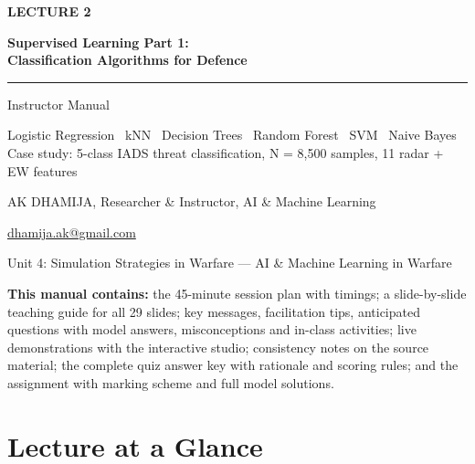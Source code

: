 \documentclass[11pt]{article}
\begin{document}
\begin{titlepage}\centering\vspace*{2.2cm}
{\color{AccN}\large\bfseries LECTURE 2\par}\vspace{0.6cm}
{\color{NavyN}\Huge\bfseries Supervised Learning Part 1:\\Classification Algorithms for Defence\par}\vspace{0.6cm}
{\color{AccN}\rule{0.7\textwidth}{1.5pt}}\par\vspace{0.6cm}
{\LARGE Instructor Manual\par}\vspace{0.4cm}
{\large\begin{minipage}{0.85\textwidth}\centering Logistic Regression \textbullet\ kNN \textbullet\ Decision Trees \textbullet\ Random Forest \textbullet\ SVM \textbullet\ Naive Bayes\\Case study: 5-class IADS threat classification, N = 8,500 samples, 11 radar + EW features\end{minipage}\par}\vspace{2cm}
{\large AK DHAMIJA, Researcher \& Instructor, AI \& Machine Learning\par}\vspace{0.2cm}
{\normalsize \href{mailto:dhamija.ak@gmail.com}{dhamija.ak@gmail.com} \quad\textbullet{}\par}\vspace{0.3cm}
{Unit 4: Simulation Strategies in Warfare --- AI \& Machine Learning in Warfare\par}\vfill
\begin{tcolorbox}[colback=NavyN!4,colframe=NavyN,boxrule=0.6pt,arc=2pt,width=0.9\textwidth]\small
\textbf{This manual contains:} the 45-minute session plan with timings; a slide-by-slide teaching guide for all 29 slides; key messages, facilitation tips, anticipated questions with model answers, misconceptions and in-class activities; live demonstrations with the interactive studio; consistency notes on the source material; the complete quiz answer key with rationale and scoring rules; and the assignment with marking scheme and full model solutions.
\end{tcolorbox}
\end{titlepage}
\tableofcontents\newpage


\section{Lecture at a Glance}
\end{document}
